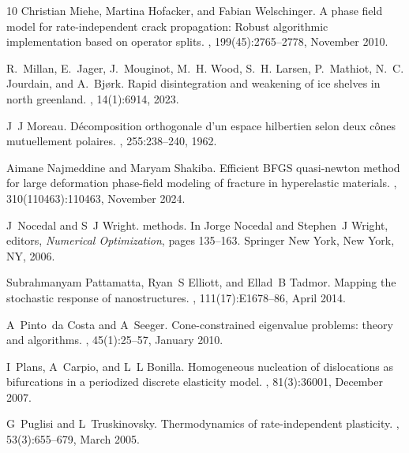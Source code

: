 \documentclass[10pt]{article}
\begin{document}
\begin{thebibliography}{10}
    Christian Miehe, Martina Hofacker, and Fabian Welschinger.
    \newblock A phase field model for rate-independent crack propagation: Robust algorithmic implementation based on operator splits.
    , 199(45):2765--2778, November 2010.

    R.~Millan, E.~Jager, J.~Mouginot, M.~H. Wood, S.~H. Larsen, P.~Mathiot, N.~C. Jourdain, and A.~Bj{\o}rk.
    \newblock Rapid disintegration and weakening of ice shelves in north greenland.
    , 14(1):6914, 2023.

    J~J Moreau.
    \newblock D{\'e}composition orthogonale d'un espace hilbertien selon deux c{\^o}nes mutuellement polaires.
    , 255:238--240, 1962.

    Aimane Najmeddine and Maryam Shakiba.
    \newblock Efficient {BFGS} quasi-newton method for large deformation phase-field modeling of fracture in hyperelastic materials.
    , 310(110463):110463, November 2024.

    J~Nocedal and S~J Wright.
     methods.
    \newblock In Jorge Nocedal and Stephen~J Wright, editors, {\em Numerical Optimization}, pages 135--163. Springer New York, New York, NY, 2006.

    Subrahmanyam Pattamatta, Ryan~S Elliott, and Ellad~B Tadmor.
    \newblock Mapping the stochastic response of nanostructures.
    , 111(17):E1678--86, April 2014.

    A~Pinto~da Costa and A~Seeger.
    \newblock Cone-constrained eigenvalue problems: theory and algorithms.
    , 45(1):25--57, January 2010.

    I~Plans, A~Carpio, and L~L Bonilla.
    \newblock Homogeneous nucleation of dislocations as bifurcations in a periodized discrete elasticity model.
    , 81(3):36001, December 2007.

    G~Puglisi and L~Truskinovsky.
    \newblock Thermodynamics of rate-independent plasticity.
    , 53(3):655--679, March 2005.


\end{thebibliography}
\end{document}
